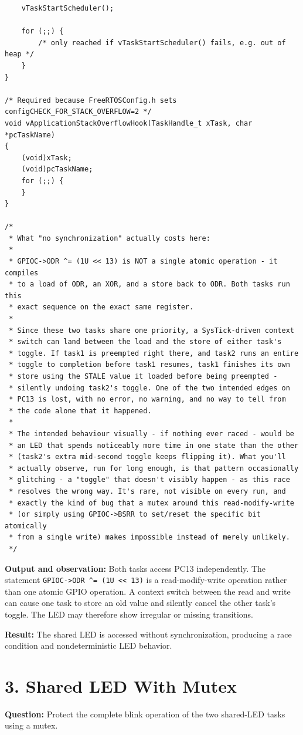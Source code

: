 ﻿\documentclass[12pt,a4paper]{article}
\begin{document}
\begin{lstlisting}
    vTaskStartScheduler();

    for (;;) {
        /* only reached if vTaskStartScheduler() fails, e.g. out of heap */
    }
}

/* Required because FreeRTOSConfig.h sets configCHECK_FOR_STACK_OVERFLOW=2 */
void vApplicationStackOverflowHook(TaskHandle_t xTask, char *pcTaskName)
{
    (void)xTask;
    (void)pcTaskName;
    for (;;) {
    }
}

/*
 * What "no synchronization" actually costs here:
 *
 * GPIOC->ODR ^= (1U << 13) is NOT a single atomic operation - it compiles
 * to a load of ODR, an XOR, and a store back to ODR. Both tasks run this
 * exact sequence on the exact same register.
 *
 * Since these two tasks share one priority, a SysTick-driven context
 * switch can land between the load and the store of either task's
 * toggle. If task1 is preempted right there, and task2 runs an entire
 * toggle to completion before task1 resumes, task1 finishes its own
 * store using the STALE value it loaded before being preempted -
 * silently undoing task2's toggle. One of the two intended edges on
 * PC13 is lost, with no error, no warning, and no way to tell from
 * the code alone that it happened.
 *
 * The intended behaviour visually - if nothing ever raced - would be
 * an LED that spends noticeably more time in one state than the other
 * (task2's extra mid-second toggle keeps flipping it). What you'll
 * actually observe, run for long enough, is that pattern occasionally
 * glitching - a "toggle" that doesn't visibly happen - as this race
 * resolves the wrong way. It's rare, not visible on every run, and
 * exactly the kind of bug that a mutex around this read-modify-write
 * (or simply using GPIOC->BSRR to set/reset the specific bit atomically
 * from a single write) makes impossible instead of merely unlikely.
 */
\end{lstlisting}

\textbf{Output and observation:}
Both tasks access PC13 independently. The statement
\texttt{GPIOC->ODR \^{}= (1U << 13)} is a read-modify-write operation rather
than one atomic GPIO operation. A context switch between the read and write
can cause one task to store an old value and silently cancel the other task's
toggle. The LED may therefore show irregular or missing transitions.

\textbf{Result:} The shared LED is accessed without synchronization, producing
a race condition and nondeterministic LED behavior.

\newpage
\section*{3. Shared LED With Mutex}
\textbf{Question:} Protect the complete blink operation of the two shared-LED
tasks using a mutex.
\end{document}
